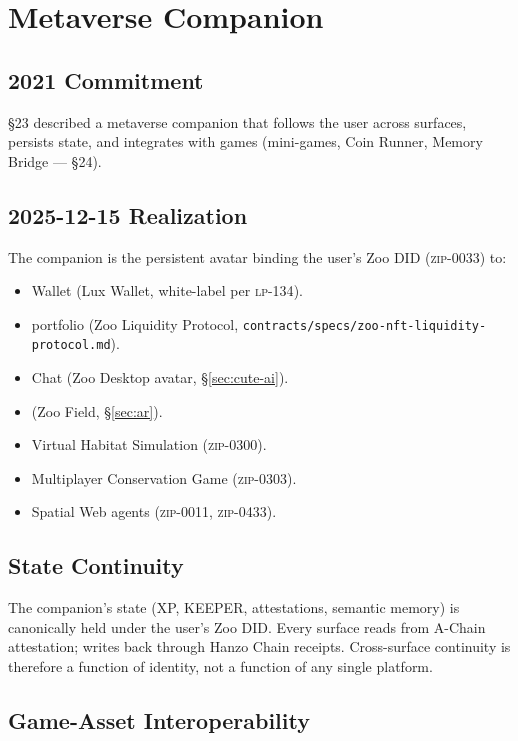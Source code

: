 \section{Metaverse Companion}
\label{sec:metaverse}

\subsection{2021 Commitment}

\S23 described a metaverse companion that follows the user across
surfaces, persists state, and integrates with games (mini-games,
Coin Runner, Memory Bridge --- \S24).

\subsection{2025-12-15 Realization}

The companion is the persistent avatar binding the user's Zoo DID
(\textsc{zip-0033}) to:

\begin{itemize}[nosep,leftmargin=1.2em]
\item Wallet (Lux Wallet, white-label per \textsc{lp-134}).
\item \NFT{} portfolio (Zoo \NFT{} Liquidity Protocol,
  \texttt{contracts/specs/zoo-nft-liquidity-protocol.md}).
\item Chat (Zoo Desktop avatar, \S\ref{sec:cute-ai}).
\item \AR{} (Zoo Field, \S\ref{sec:ar}).
\item Virtual Habitat Simulation (\textsc{zip-0300}).
\item Multiplayer Conservation Game (\textsc{zip-0303}).
\item Spatial Web agents (\textsc{zip-0011}, \textsc{zip-0433}).
\end{itemize}

\subsection{State Continuity}

The companion's state (XP, KEEPER, attestations, semantic memory) is
canonically held under the user's Zoo DID. Every surface reads from
A-Chain attestation; writes back through Hanzo \AI{} Chain receipts.
Cross-surface continuity is therefore a function of identity, not a
function of any single platform.

\subsection{Game-Asset Interoperability}

